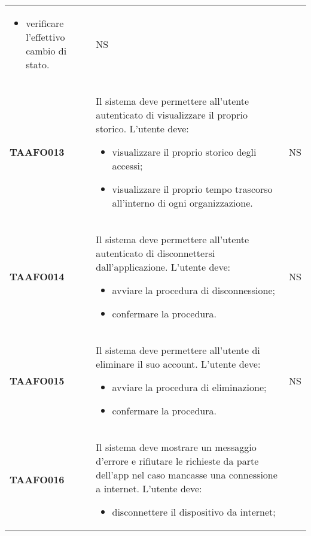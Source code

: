 \documentclass[../piano-di-qualifica.tex]{subfiles}
\begin{document}
\begin{centering}
\begin{longtable}[H]{>{\centering\bfseries}m{3cm} >{}p{10cm} >{\centering\arraybackslash}m{3cm}}
\begin{itemize}
                        \item verificare l'effettivo cambio di stato.
                      \end{itemize}
                      & NS \\
        TAAFO013      & Il sistema deve permettere all’utente autenticato di visualizzare il proprio storico. \newline
                      L’utente deve:
                      \begin{itemize}
                        \item visualizzare il proprio storico degli accessi;
                        \item visualizzare il proprio tempo trascorso all'interno di ogni organizzazione.
                      \end{itemize}
                      & NS \\
        TAAFO014      & Il sistema deve permettere all’utente autenticato di disconnettersi dall’applicazione. \newline
                      L’utente deve:
                      \begin{itemize}
                        \item avviare la procedura di disconnessione;
                        \item confermare la procedura.
                      \end{itemize}
                      & NS \\
        TAAFO015      & Il sistema deve permettere all’utente di eliminare il suo account. \newline
                      L’utente deve:
                      \begin{itemize}
                        \item avviare la procedura di eliminazione;
                        \item confermare la procedura.
                      \end{itemize}
                      & NS \\
        TAAFO016      & Il sistema deve mostrare un messaggio d’errore e rifiutare le richieste da parte dell’app nel caso mancasse una connessione a internet. \newline
                      L’utente deve:
                      \begin{itemize}
                        \item disconnettere il dispositivo da internet;

\end{itemize}
\end{longtable}
\end{centering}
\end{document}
